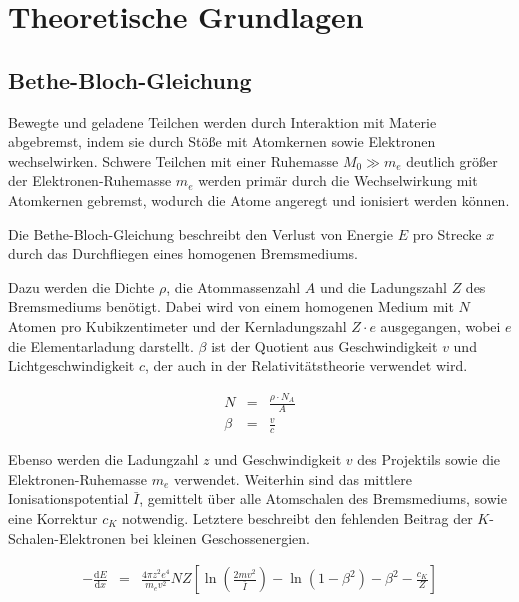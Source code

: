 \documentclass[12pt,a4paper]{scrartcl}
\numberwithin{equation}{section} %
\renewcommand{\[}{} %
\renewcommand{\]}{\noindent} %
\begin{document}
\hypertarget{theoretische-grundlagen}{%
\section{Theoretische Grundlagen}\label{theoretische-grundlagen}}

\hypertarget{bethe-bloch-gleichung}{%
\subsection{Bethe-Bloch-Gleichung}\label{bethe-bloch-gleichung}}

Bewegte und geladene Teilchen werden durch Interaktion mit Materie
abgebremst, indem sie durch Stöße mit Atomkernen sowie Elektronen
wechselwirken. Schwere Teilchen mit einer Ruhemasse \(M_0\gg m_e\)
deutlich größer der Elektronen-Ruhemasse \(m_e\) werden primär durch die
Wechselwirkung mit Atomkernen gebremst, wodurch die Atome angeregt und
ionisiert werden können.

Die Bethe-Bloch-Gleichung beschreibt den Verlust von Energie \(E\) pro
Strecke \(x\) durch das Durchfliegen eines homogenen Bremsmediums.

Dazu werden die Dichte \(\rho\), die Atommassenzahl \(A\) und die
Ladungszahl \(Z\) des Bremsmediums benötigt. Dabei wird von einem
homogenen Medium mit \(N\) Atomen pro Kubikzentimeter und der
Kernladungszahl \(Z\cdot e\) ausgegangen, wobei \(e\) die
Elementarladung darstellt. \(\beta\) ist der Quotient aus
Geschwindigkeit \(v\) und Lichtgeschwindigkeit \(c\), der auch in der
Relativitätstheorie verwendet wird.

\[
\begin{eqnarray}
    N &=& \frac{\rho\cdot N_A}{A} \\
    \beta &=& \frac{v}{c}
\end{eqnarray}
\]

Ebenso werden die Ladungzahl \(z\) und Geschwindigkeit \(v\) des
Projektils sowie die Elektronen-Ruhemasse \(m_e\) verwendet. Weiterhin
sind das mittlere Ionisationspotential \(\bar I\), gemittelt über alle
Atomschalen des Bremsmediums, sowie eine Korrektur \(c_K\) notwendig.
Letztere beschreibt den fehlenden Beitrag der \(K\)-Schalen-Elektronen
bei kleinen Geschossenergien.

\[
\begin{eqnarray}
    -\frac{\mathrm dE}{\mathrm dx} &=&
        \frac{4\pi z^2 e^4}{m_e v^2} NZ
        \left[
            \ln\left(\frac{2mv^2}{\bar I}\right)
            - \ln\left(1 - \beta^2\right)
            - \beta^2
            - \frac{c_K}{Z}
        \right]
        \label{BetheBloch}
\end{eqnarray}
\]
\end{document}
